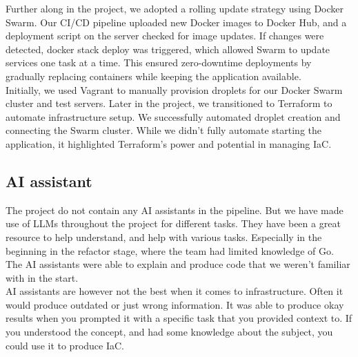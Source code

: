 Further along in the project, we adopted a rolling update strategy using Docker Swarm. Our CI/CD pipeline uploaded new Docker images to Docker Hub, and a deployment script on the server checked for image updates. If changes were detected, docker stack deploy was triggered, which allowed Swarm to update services one task at a time. This ensured zero-downtime deployments by gradually replacing containers while keeping the application available.
\\

Initially, we used Vagrant to manually provision droplets for our Docker Swarm cluster and test servers. Later in the project, we transitioned to Terraform to automate infrastructure setup. We successfully automated droplet creation and connecting the Swarm cluster. While we didn’t fully automate starting the application, it highlighted Terraform’s power and potential in managing IaC.

\subsection{AI assistant} 

The project do not contain any AI assistants in the pipeline. But we have made use of LLMs throughout the project for different tasks. They have been a great resource to help understand, and help with various tasks. Especially in the beginning in the refactor stage, where the team had limited knowledge of Go. The AI assistants were able to explain and produce code that we weren't familiar with in the start.
\\
AI assistants are however not the best when it comes to infrastructure. Often it would produce outdated or just wrong information. It was able to produce okay results when you prompted it with a specific task that you provided context to. If you understood the concept, and had some knowledge about the subject, you could use it to produce IaC. 